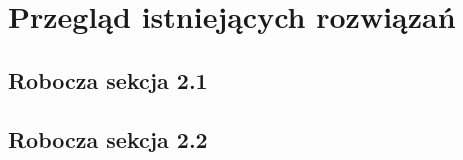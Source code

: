 \chapter{Przegląd istniejących rozwiązań}

\section{Robocza sekcja 2.1}
\sectionanchor

\section{Robocza sekcja 2.2}
\sectionanchor
